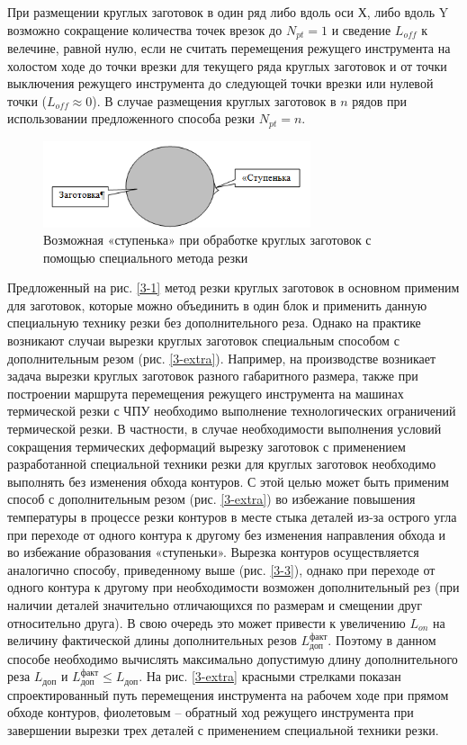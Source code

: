 \documentclass{article}
\begin{document}
При размещении круглых заготовок в один ряд
либо вдоль оси Х, либо вдоль Y
возможно сокращение количества точек врезок до
$N_{pt}=1$
и сведение
$L_{off}$
к велечине, равной нулю, если не считать перемещения
режущего инструмента на холостом ходе до точки врезки
для текущего ряда круглых заготовок и от точки выключения
режущего инструмента до следующей точки врезки или нулевой точки
($L_{off} \approx 0$).
В случае размещения круглых заготовок в $n$
рядов при использовании предложенного способа резки
$N_{pt}=n$.

\begin{figure}
  \begin{center}
  \includegraphics[width=0.7\textwidth]{hiccup.png}
  \caption{Возможная «ступенька» при обработке круглых заготовок с помощью специального метода резки}
  \label{hiccup}
  \end{center}
\end{figure}

Предложенный на рис. \ref{3-1}
метод резки круглых заготовок в основном применим для заготовок,
которые можно объединить в один блок и применить
данную специальную технику резки без дополнительного реза.
Однако на практике возникают случаи вырезки круглых заготовок
специальным способом с дополнительным резом
(рис. \ref{3-extra}).
Например, на производстве возникает задача
вырезки круглых заготовок разного габаритного размера,
также при построении маршрута перемещения режущего инструмента
на машинах термической резки с ЧПУ необходимо выполнение
технологических ограничений термической резки.
В частности, в случае необходимости выполнения условий
сокращения термических деформаций вырезку заготовок с
применением разработанной специальной техники резки
для круглых заготовок необходимо выполнять без изменения обхода контуров.
С этой целью может быть применим способ с дополнительным резом
(рис. \ref{3-extra})
во избежание повышения температуры в процессе резки контуров
в месте стыка деталей из-за острого угла
при переходе от одного контура к другому без изменения
направления обхода и во избежание образования «ступеньки».
Вырезка контуров осуществляется аналогично способу,
приведенному выше (рис. \ref{3-3}),
однако при переходе от одного контура к другому
при необходимости возможен дополнительный рез
(при наличии деталей значительно отличающихся по размерам и смещении друг относительно друга).
В свою очередь это может привести к увеличению
$L_{on}$
на величину фактической длины дополнительных резов
$L_\text{доп}^\text{факт}$.
Поэтому в данном способе необходимо вычислять максимально допустимую длину дополнительного реза
$L_\text{доп}$
и
$L_\text{доп}^\text{факт} \leqslant L_\text{доп}$.
На рис. \ref{3-extra}
красными стрелками показан спроектированный путь
перемещения инструмента на рабочем ходе при прямом обходе контуров,
фиолетовым – обратный ход режущего инструмента
при завершении вырезки трех деталей с
применением специальной техники резки.
\end{document}
